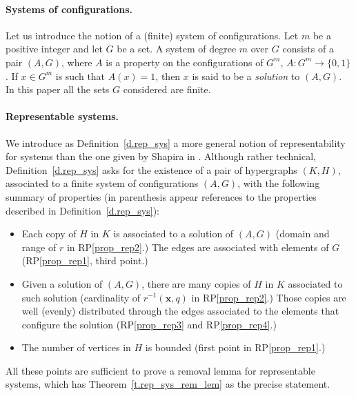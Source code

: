 \documentclass[10pt]{article}
\begin{document}
\paragraph{Systems of configurations.}

Let us introduce the notion of a (finite) system of configurations.
Let $m$ be a positive integer and let $G$ be a set. A system of degree $m$ over $G$ consists of a pair $(A,G)$, where $A$ is a property on the configurations of $G^m$, $A: G^m\to \{0,1\}$. If
$x\in G^m$ is such that $A(x)=1$, then $x$ is said to be a \emph{solution} to $(A,G)$. In this paper all the sets $G$ considered are finite.


\paragraph{Representable systems.}


We introduce as Definition~\ref{d.rep_sys} a more general notion of representability for systems than the one given by Shapira in \cite[Definition~2.4]{sha10}. Although rather technical, Definition~\ref{d.rep_sys} asks for the existence of a pair of hypergraphs $(K,H)$, associated to a finite system  of configurations $(A,G)$,
with the following summary of properties (in parenthesis appear references to the properties described in Definition~\ref{d.rep_sys}):
\begin{itemize}
	\item Each copy of $H$ in $K$ is associated to a solution of $(A,G)$ (domain and range of $r$ in RP\ref{prop_rep2}.) The edges are associated with elements of $G$ (RP\ref{prop_rep1}, third point.) 
	\item Given a solution of $(A,G)$, there are many copies of $H$ in $K$ associated to such solution (cardinality of $r^{-1}(\mathbf{x},q)$ in RP\ref{prop_rep2}.) Those copies are well (evenly) distributed through the edges associated to the elements that configure the solution (RP\ref{prop_rep3} and RP\ref{prop_rep4}.)
	\item The number of vertices in $H$ is bounded (first point in RP\ref{prop_rep1}.)
\end{itemize}
All these points are sufficient to prove a removal lemma for representable systems, which has Theorem~\ref{t.rep_sys_rem_lem} as the precise statement.
\end{document}
